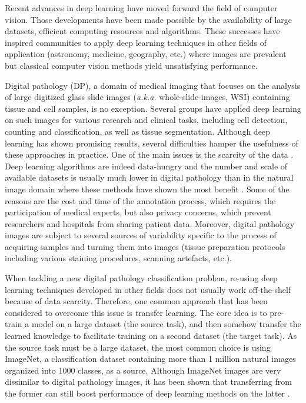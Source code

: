 Recent advances in deep learning have moved forward the field of computer vision. Those developments have been made possible by the availability of large datasets, efficient computing resources and algorithms. These successes have inspired communities to apply deep learning techniques in other fields of application (astronomy, medicine, geography, etc.) where images are prevalent but classical computer vision methods yield unsatisfying performance.

Digital pathology (DP), a domain of medical imaging that focuses on the analysis of large digitized glass slide images (\textit{a.k.a.} whole-slide-images, WSI) containing tissue and cell samples, is no exception. Several groups have applied deep learning on such images for various research and clinical tasks, including cell detection, counting and classification, as well as tissue segmentation. Although deep learning has shown promising results, several difficulties hamper the usefulness of these approaches in practice. One of the main issues is the scarcity of the data \parencite{tizhoosh2018artificial,litjens2017survey,robertson2018digital,komura2018machine}. Deep learning algorithms are indeed data-hungry and the number and scale of available datasets is usually much lower in digital pathology than in the natural image domain where these methods have shown the most benefit \parencite{deng2009imagenet}. Some of the reasons are the cost and time of the annotation process, which requires the participation of medical experts, but also privacy concerns, which prevent researchers and hospitals from sharing patient data. Moreover, digital pathology images are subject to several sources of variability specific to the process of acquiring samples and turning them into images (tissue preparation protocols including various staining procedures, scanning artefacts, etc.). 

When tackling a new digital pathology classification problem, re-using deep learning techniques developed in other fields does not usually work off-the-shelf because of data scarcity. Therefore, one common approach that has been considered to overcome this issue is transfer learning. The core idea is to pre-train a model on a large dataset (the source task), and then somehow transfer the learned knowledge to facilitate training on a second dataset (the target task). As the source task must be a large dataset, the most common choice is using ImageNet, a classification dataset containing more than 1 million natural images organized into 1000 classes, as a source. Although ImageNet images are very dissimilar to digital pathology images, it has been shown that transferring from the former can still boost performance of deep learning methods on the latter \parencite{mormont2018comparison,shang2019and}.

